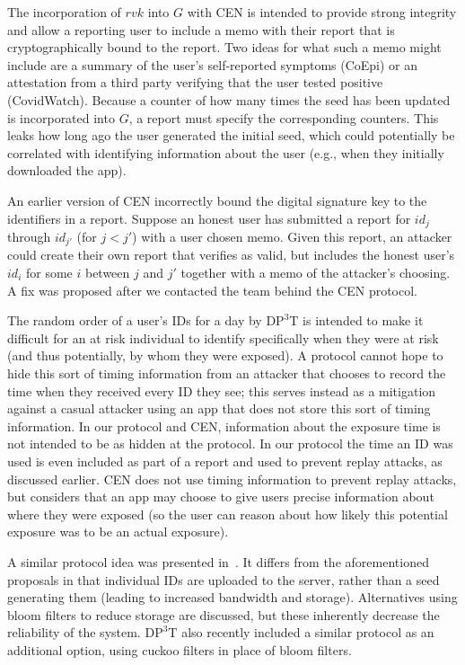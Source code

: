 The incorporation of $rvk$ into $G$ with CEN is intended to provide strong integrity and allow a reporting user to include a memo with their report that is cryptographically bound to the report. Two ideas for what such a memo might include are a summary of the user's self-reported symptoms (CoEpi) or an attestation from a third party verifying that the user tested positive (CovidWatch). Because a counter of how many times the seed has been updated is incorporated into $G$, a report must specify the corresponding counters. This leaks how long ago the user generated the initial seed, which could potentially be correlated with identifying information about the user (e.g., when they initially downloaded the app). 

An earlier version of CEN incorrectly bound the digital signature key to the identifiers in a report.
Suppose an honest user has submitted a report for $id_{j}$ through $id_{j'}$ (for $j<j'$) with a user chosen memo. 
Given this report, an attacker could create their own report that verifies as valid, but includes the honest user's $id_{i}$ for some $i$ between $j$ and $j'$ together with a memo of the attacker's choosing.
A fix was proposed after we contacted the team behind the CEN protocol.

The random order of a user's IDs for a day by $\mathrm{DP^3T}$ is intended to make it difficult for an at risk individual to identify specifically when they were at risk (and thus potentially, by whom they were exposed).
A protocol cannot hope to hide this sort of timing information from an attacker that chooses to record the time when they received every ID they see; this serves instead as a mitigation against a casual attacker using an app that does not store this sort of timing information.  
In our protocol and CEN, information about the exposure time is not intended to be as hidden at the protocol. In our protocol the time an ID was used is even included as part of a report and used to prevent replay attacks, as discussed earlier.
CEN does not use timing information to prevent replay attacks, but considers that an app may choose to give users precise information about where they were exposed (so the user can reason about how likely this potential exposure was to be an actual exposure).

A similar protocol idea was presented in~\cite{BU}. 
It differs from the aforementioned proposals in that 
individual IDs are uploaded to the server, rather than a seed generating them (leading to increased bandwidth and storage).
Alternatives using bloom filters to reduce storage are discussed, but these inherently decrease the reliability of the system. $\mathrm{DP^3T}$ also recently included a similar protocol as an additional option, using cuckoo filters in place of bloom filters.

